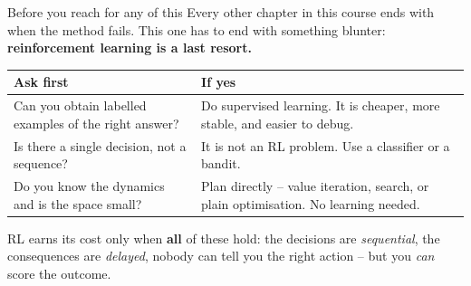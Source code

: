 \documentclass[aspectratio=169]{beamer}
\begin{document}
\begin{frame}{Before you reach for any of this}
  Every other chapter in this course ends with when the method fails. This one has to end with
  something blunter: \textbf{reinforcement learning is a last resort.}

  \vskip 8pt
  \begin{center}
  \small
  \begin{tabular}{p{5.6cm} p{6.4cm}}
    \toprule
    \textbf{Ask first} & \textbf{If yes} \\
    \midrule
    Can you obtain labelled examples of the right answer? & Do supervised learning. It is
      cheaper, more stable, and easier to debug. \\[4pt]
    Is there a single decision, not a sequence? & It is not an RL problem. Use a classifier
      or a bandit. \\[4pt]
    Do you know the dynamics and is the space small? & Plan directly -- value iteration,
      search, or plain optimisation. No learning needed. \\
    \bottomrule
  \end{tabular}
  \end{center}

  \vskip 8pt
  \begin{tcolorbox}[colback=paramgreen!8, colframe=paramgreen, boxrule=0.6pt, arc=2pt]
    \small
    RL earns its cost only when \textbf{all} of these hold: the decisions are
    \emph{sequential}, the consequences are \emph{delayed}, nobody can tell you the right
    action -- but you \emph{can} score the outcome.
  \end{tcolorbox}
\end{frame}
\end{document}
